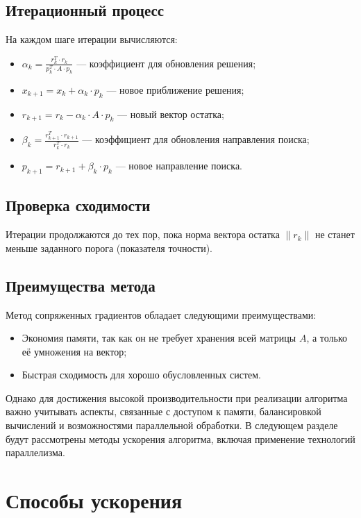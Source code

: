 \documentclass[12pt]{extarticle}
\begin{document}
\begin{spacing}{1.5}
    \subsection{Итерационный процесс}
    На каждом шаге итерации вычисляются:
    \begin{itemize}
        \item \(\alpha_k = \frac{r_k^T \cdot r_k}{p_k^T \cdot A \cdot p_k}\) — коэффициент для обновления решения;
        \item \(x_{k+1} = x_k + \alpha_k \cdot p_k\) — новое приближение решения;
        \item \(r_{k+1} = r_k - \alpha_k \cdot A \cdot p_k\) — новый вектор остатка;
        \item \(\beta_k = \frac{r_{k+1}^T \cdot r_{k+1}}{r_k^T \cdot r_k}\) — коэффициент для обновления направления поиска;
        \item \(p_{k+1} = r_{k+1} + \beta_k \cdot p_k\) — новое направление поиска.
    \end{itemize}

    \subsection{Проверка сходимости}
    Итерации продолжаются до тех пор, пока норма вектора остатка \(\|r_k\|\) не станет меньше заданного порога (показателя точности).

    \subsection{Преимущества метода}
    Метод сопряженных градиентов обладает следующими преимуществами:
    \begin{itemize}
        \item Экономия памяти, так как он не требует хранения всей матрицы \(A\), а только её умножения на вектор;
        \item Быстрая сходимость для хорошо обусловленных систем.
    \end{itemize}

    Однако для достижения высокой производительности при реализации алгоритма важно учитывать аспекты, связанные с доступом к памяти, балансировкой вычислений и возможностями параллельной обработки. В следующем разделе будут рассмотрены методы ускорения алгоритма, включая применение технологий параллелизма.


    \newpage
    \section{Способы ускорения}


\end{spacing}
\end{document}
